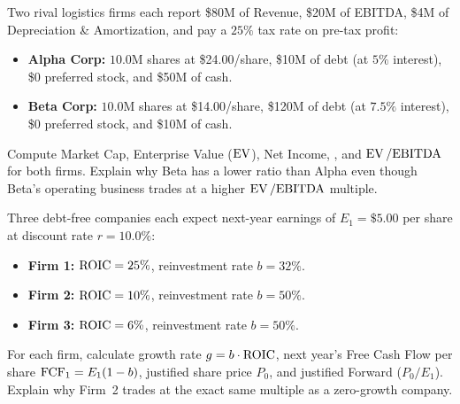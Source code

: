 \begin{exercise}
Two rival logistics firms each report \$80M of Revenue, \$20M of EBITDA, \$4M of Depreciation \& Amortization, and pay a $25\%$ tax rate on pre-tax profit:
\begin{itemize}
 \item \textbf{Alpha Corp:} $10.0$M shares at \$24.00/share, \$10M of debt (at $5\%$ interest), \$0 preferred stock, and \$50M of cash.
 \item \textbf{Beta Corp:} $10.0$M shares at \$14.00/share, \$120M of debt (at $7.5\%$ interest), \$0 preferred stock, and \$10M of cash.
\end{itemize}
Compute Market Cap, Enterprise Value ($\operatorname{EV}$), Net Income, , and $\operatorname{EV} / \text{EBITDA}$ for both firms. Explain why Beta has a lower  ratio than Alpha even though Beta's operating business trades at a higher $\operatorname{EV} / \text{EBITDA}$ multiple.
\end{exercise}

\begin{exercise}
Three debt-free companies each expect next-year earnings of $E_1 = \$5.00$ per share at discount rate $r = 10.0\%$:
\begin{itemize}
 \item \textbf{Firm 1:} $\operatorname{ROIC} = 25\%$, reinvestment rate $b = 32\%$.
 \item \textbf{Firm 2:} $\operatorname{ROIC} = 10\%$, reinvestment rate $b = 50\%$.
 \item \textbf{Firm 3:} $\operatorname{ROIC} = 6\%$, reinvestment rate $b = 50\%$.
\end{itemize}
For each firm, calculate growth rate $g = b \cdot \operatorname{ROIC}$, next year's Free Cash Flow per share $\operatorname{FCF}_1 = E_1(1 - b)$, justified share price $P_0$, and justified Forward  ($P_0 / E_1$). Explain why Firm~2 trades at the exact same multiple as a zero-growth company.
\end{exercise}
